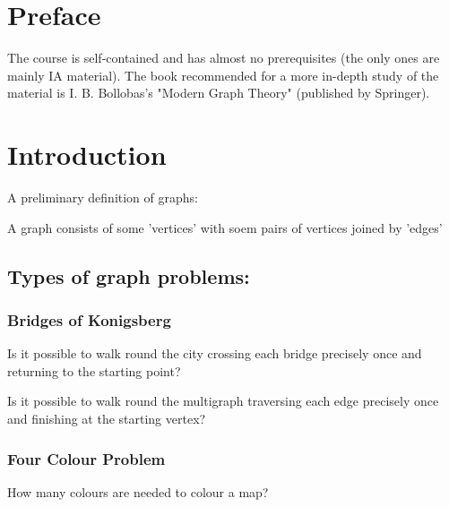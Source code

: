 

\def\ntitle{Graph Theory}
\def\nauthor{mostanes}
\def\npart{II}
\def\nterm{Michelmas}
\def\nyear{2018}
\def\nlecturer{Paul Russel}

	
	\mktitlepage
	
	\newpage
	
	\setcounter{section}{-1}
	
\section{Preface}
The course is self-contained and has almost no prerequisites (the only ones are mainly IA material). The book recommended for a more in-depth study of the material is I. B. Bollobas's "Modern Graph Theory" (published by Springer).

\newpage

\section{Introduction}
A preliminary definition of graphs:
\begin{definition}
	A graph consists of some 'vertices' with soem pairs of vertices joined by 'edges'
\end{definition}

\subsection{Types of graph problems:}
\subsubsection{Bridges of Konigsberg}
\begin{question}Is it possible to walk round the city crossing each bridge precisely once and returning to the starting point?
\end{question}
\begin{question}
Is it possible to walk round the multigraph traversing each edge precisely once and finishing at the starting vertex?
\end{question}
\subsubsection{Four Colour Problem}
\begin{question}
	How many colours are needed to colour a map?
\end{question}
